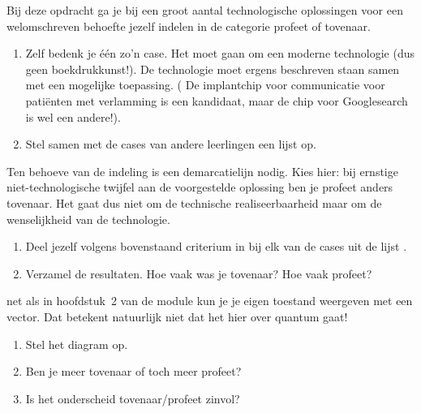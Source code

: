 \documentclass[../../main.tex]{subfiles}
\begin{document}
\begin{opdrachtlang}\label{opd:tovprof}
Bij deze opdracht ga je bij een groot aantal technologische oplossingen voor een welomschreven behoefte jezelf indelen in de categorie profeet of tovenaar. 
\begin{enumerate}
\item Zelf bedenk  je één zo'n case. Het moet gaan om een moderne technologie (dus geen boekdrukkunst!). De technologie moet ergens beschreven staan samen met een mogelijke toepassing. ( De implantchip voor communicatie voor pati\"enten met verlamming is een kandidaat, maar de chip voor Googlesearch is wel een andere!).
\item Stel samen  met de cases van andere leerlingen een lijst op. 
\end{enumerate}
Ten behoeve van de indeling is een demarcatielijn nodig. Kies hier: bij ernstige niet-technologische twijfel aan de voorgestelde oplossing ben je profeet anders tovenaar. Het gaat dus niet om de technische realiseerbaarheid maar om de wenselijkheid van de technologie. 
\begin{enumerate}[resume]
\item Deel jezelf volgens bovenstaand criterium in bij elk van de cases uit de lijst .
\item Verzamel de resultaten. Hoe vaak was je tovenaar? Hoe vaak profeet?
\end{enumerate}
net als in hoofdstuk~2 van de module kun je je eigen toestand weergeven met een vector. Dat betekent natuurlijk niet dat het hier over quantum gaat!

\begin{enumerate}[resume]
\item Stel het diagram op. 
\item Ben je meer tovenaar of toch meer profeet?
\item Is het onderscheid tovenaar/profeet zinvol?
\end{enumerate}
\end{opdrachtlang}

\end{document}

